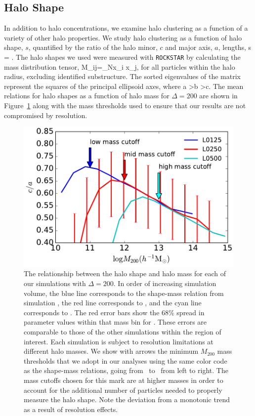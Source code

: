 \documentclass[usenatbib,fleqn]{mnras}
\begin{document}
\subsection{Halo Shape}

In addition to halo concentrations, we examine halo clustering as a function of a variety of other 
halo properties. We study halo clustering as a function of halo shape, $s$, 
quantified by the ratio of the halo minor, $c$ and major axis, $a$, lengths, 
%
\beq
s = .
\eeq
%
The halo shapes we used were measured with {\tt ROCKSTAR} by calculating the mass distribution tensor,
\beq
M_{ij}=\sum\limits_{N}x_i x_j,
\eeq
for
all particles within the halo radius, excluding identified substructure. The sorted eigenvalues of the matrix represent
the squares of the principal ellipsoid axes, where a \textgreater b \textgreater c.   The mean relations for halo shapes as a function of halo mass for $\Delta=200$ are shown in Figure~\ref{fig:srelation} along with the mass 
thresholds used to ensure that our results are not compromised by 
resolution.


\begin{figure}
\centering
\includegraphics[width=.5\textwidth]{masscut_shape_d200.pdf}
\caption{
The relationship between the halo shape and halo mass for each of our simulations with $\Delta =200$. 
In order of increasing simulation volume, the blue line corresponds to the shape-mass relation from simulation 
\simA, the red line corresponds to \simB, and the cyan line corresponds to \simC. The red error bars show the 68\% spread in
parameter values within that mass bin for \simB. These errors are comparable to those of the other simulations
within the region of interest.
Each simulation is subject to resolution limitations at different halo masses. We show with arrows 
the minimum $M_{200}$ mass thresholds that we adopt in our analyses using the same color code as 
the shape-mass relations, going from \simA \ to \simC \ from left to right. The mass cutoffs chosen for this mark
are at higher masses in order to account for the additional number of particles needed to properly measure the
halo shape. Note the deviation from a monotonic trend as a result of resolution effects.
}
\label{fig:srelation}
\end{figure}
\end{document}
